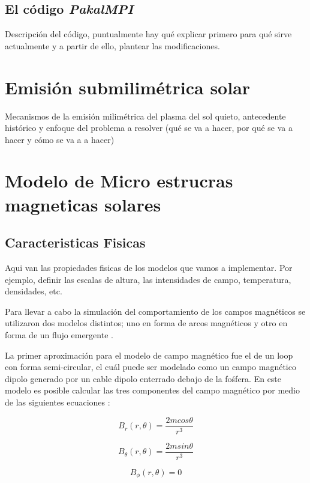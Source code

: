 \documentclass[9pt]{book}
\begin{document}
\section{El c\'odigo \emph{PakalMPI}}
Descripci\'on del c\'odigo, puntualmente hay qu\'e explicar primero para qu\'e sirve actualmente y a partir de ello, plantear las modificaciones.


\chapter{Emisi\'on submilim\'etrica solar}
Mecanismos de la emisi\'on milim\'etrica del plasma del sol quieto, antecedente hist\'orico y enfoque del problema a resolver (qu\'e se va a hacer, por qu\'e se va a hacer y c\'omo se va a a hacer)
  
\chapter{Modelo de Micro estrucras magneticas solares}
\section{Caracteristicas Fisicas}
Aqui van las propiedades fisicas de los modelos que vamos a implementar. Por ejemplo, definir las escalas de altura, las intensidades de campo, temperatura, densidades, etc.

Para llevar a cabo la simulaci\'on del comportamiento de los campos magn\'eticos se utilizaron dos modelos distintos; uno en forma de arcos magn\'eticos \cite{loops} y otro en forma de un flujo emergente \cite{flujoemergente}.

La primer aproximaci\'on para el modelo de campo magn\'etico fue el de un loop con forma semi-circular, el cu\'al puede ser modelado como un campo magn\'etico dipolo generado por un cable dipolo enterrado debajo de la fo\'sfera.
En este modelo es posible calcular las tres componentes del campo magn\'etico por medio de las siguientes ecuaciones :

\begin{equation}
    B_r(r,\theta)=\frac{2mcos\theta}{r^3}
\end{equation}
  
\begin{equation}
    B_\theta(r,\theta)=\frac{2msin\theta}{r^3}
\end{equation}

\begin{equation}
    B_\phi(r,\theta)=0
\end{equation}
\end{document}
